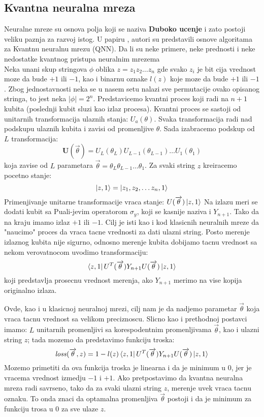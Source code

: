 \documentclass[12pt, letterpaper, oneside]{article}
\begin{document}
\subsection{Kvantna neuralna mreza}
Neuralne mreze su osnova polja koji se naziva \textbf{Duboko ucenje} i zato postoji veliku paznja za razvoj istog.
U papiru \cite{Classification_wit_QNN}, autori su predstavili osnove algoritama za Kvantnu neuralnu mrezu (QNN).
Da li su neke primere, neke prednosti i neke nedostatke kvantnog pristupa neuralnim mrezema\\

Neka unani skup stringova $\phi$ oblika $z=z_1 z_2 \dots z_n$ gde svako $z_i$ je bit cija vrednost moze da bude $+1$ ili $-1$,
kao i binarnu oznake $l(z)$ koje moze da bude $+1$ ili $-1$. Zbog jednostavnosti neka se u nasem setu nalazi sve permutacije 
ovako opisanog stringa, to jest neka $|\phi|=2^n$.
Predstavicemo kvantni proces koji radi na $n+1$ kubita (poslednji kubit sluzi kao izlaz procesa). Kvantni proces se sastoji od 
unitarnih transformacija ulaznih stanja: ${U_a(\theta)}$.
Svaka transformacija radi nad podskupu ulaznih kubita i zavisi od promenljive $\theta$.
Sada izabracemo podskup od $L$ transformacija:
\[
  \mathbf{U}(\overrightarrow{\theta}) = U_{L}(\theta_{L}) U_{L-1}(\theta_{L-1}) \dots U_{1}(\theta_{1}) 
\]
koja zavise od $L$ parametara $\overrightarrow{\theta}=\theta_{L} \theta_{L-1} \dots \theta_{1}$.
Za svaki string $z$ kreiracemo pocetno stanje:
\[
    \Ket{z,1} = \Ket{z_1, z_2, \dots z_n, 1}
\]
Primenjivanje unitarne transformacije vraca stanje: $U(\overrightarrow{\theta})\Ket{z,1}$
Na izlazu meri se dodati kubit sa Puali-jevim operatorom $\sigma_y$, koji se kasnije naziva i $Y_{n+1}$.
Tako da na kraju imamo izlaz $+1$ ili $-1$. Cilj je isti kao i kod klasicnih neuralnih mreze da "naucimo" proces da vraca
tacne vrednosti za dati ulazni string. Posto merenje izlaznog kubita nije sigurno, odnosno merenje kubita dobijamo tacnu vrednost 
sa nekom verovatnocom uvodimo transformaciju:
\[
    \bra{z,1}U^T(\overrightarrow{\theta})Y_{n+1}U(\overrightarrow{\theta})\Ket{z,1}
\]
koji predstavlja prosecnu vrednost merenja, ako $Y_{n+1}$ merimo na vise kopija originalno izlaza. 

Ovde, kao i u klasicnoj neuralnoj mrezi, cilj nam je da nadjemo parametar $\overrightarrow{\theta}$ koja vraca tacnu vrednost sa velikom preciznoscu.
Slicno kao i prethodnoj postavci imamo: $L$ unitarnih promenljivi sa korespodentnim promenljivama $\overrightarrow{\theta}$, kao i ulazni string $z$; 
tada mozemo da predstavimo funkciju troska:
\[
    \mathit{loss}(\overrightarrow{\theta},z) = 1 - l(z)\bra{z,1}U^T(\overrightarrow{\theta})Y_{n+1}U(\overrightarrow{\theta})\Ket{z,1}
\]
Mozemo primetiti da ova funkcija troska je linearna i da je minimum u $0$, jer je vracema vrednost izmedju $-1$ i $+1$.
Ako pretpostavimo da kvantna neuralna mreza radi savrseno, tako da za svaki ulazni string $z$, merenje uvek vraca tacnu oznaku.
To onda znaci da optamalna promenljiva $\overrightarrow{\theta}$ postoji i da je minimum za funkciju trosa u $0$ za sve ulaze $z$.
\end{document}
